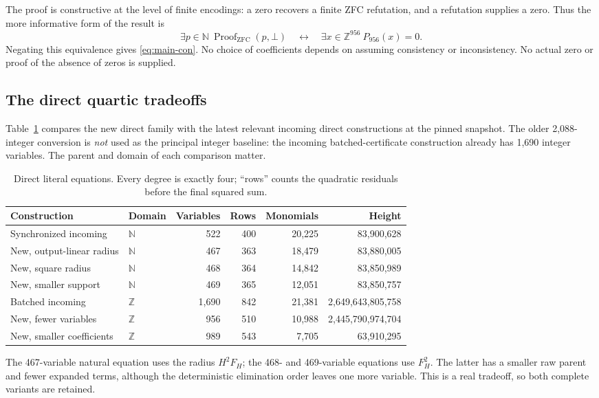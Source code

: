 \documentclass[11pt,letterpaper]{article}
\theoremstyle{definition}
\theoremstyle{remark}
\newcommand{\N}{\mathbb N}
\newcommand{\Z}{\mathbb Z}
\newcommand{\ZFC}{\mathrm{ZFC}}
\newcommand{\proofpred}{\operatorname{Proof}_{\ZFC}}
\begin{document}
The proof is constructive at the level of finite encodings: a zero
recovers a finite ZFC refutation, and a refutation supplies a zero.
Thus the more informative form of the result is
\[
 \exists p\in\N\ \proofpred(p,\bot)
 \quad\longleftrightarrow\quad
 \exists x\in\Z^{956}\ P_{956}(x)=0.
\]
Negating this equivalence gives \eqref{eq:main-con}.
No choice of coefficients depends on assuming consistency or
inconsistency. No actual zero or proof of the absence of zeros is supplied.

\subsection{The direct quartic tradeoffs}

Table~\ref{tab:quartics} compares the new direct family with the latest
relevant incoming direct constructions at the pinned snapshot. The
older 2,088-integer conversion is \emph{not} used as the principal integer
baseline: the incoming batched-certificate construction already has
1,690 integer variables. The parent and domain of each comparison matter.

\begin{table}[htbp]
\centering\small
\begin{tabular}{@{}llrrrr@{}}
\toprule
Construction & Domain & Variables & Rows & Monomials & Height\\
\midrule
Synchronized incoming & $\N$ & 522 & 400 & 20,225 & 83,900,628\\
New, output-linear radius & $\N$ & 467 & 363 & 18,479 & 83,880,005\\
New, square radius & $\N$ & 468 & 364 & 14,842 & 83,850,989\\
New, smaller support & $\N$ & 469 & 365 & 12,051 & 83,850,757\\
\addlinespace
Batched incoming & $\Z$ & 1,690 & 842 & 21,381 & 2,649,643,805,758\\
New, fewer variables & $\Z$ & 956 & 510 & 10,988 & 2,445,790,974,704\\
New, smaller coefficients & $\Z$ & 989 & 543 & 7,705 & 63,910,295\\
\bottomrule
\end{tabular}
\caption{Direct literal equations. Every degree is exactly four; ``rows''
counts the quadratic residuals before the final squared sum.}
\label{tab:quartics}
\end{table}

The 467-variable natural equation uses the radius $H^2F_H$; the 468-
and 469-variable equations use $F_H^2$. The latter has a smaller raw
parent and fewer expanded terms, although the deterministic elimination
order leaves one more variable. This is a real tradeoff, so both complete
variants are retained.
\end{document}
